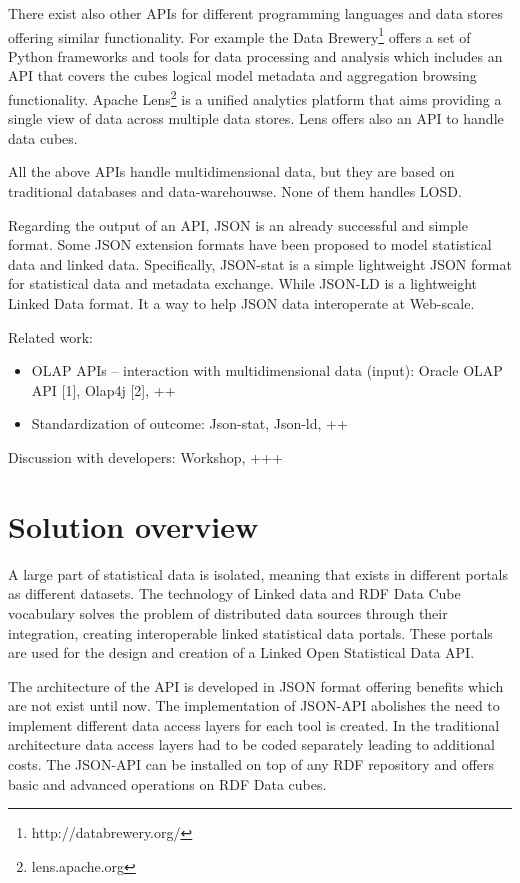 \documentclass{llncs}
\begin{document}
There exist also other APIs for different programming languages and data stores offering similar functionality. For example the Data Brewery\footnote{http://databrewery.org/} offers a set of Python frameworks and tools for data processing and analysis which includes an API that covers the cubes logical model metadata and aggregation browsing functionality. Apache Lens\footnote{lens.apache.org} is a unified analytics platform that aims providing a single view of data across multiple data stores. Lens offers also an API to handle data cubes.

All the above APIs handle multidimensional data, but they are based on traditional databases and data-warehouwse. None of them handles LOSD. 

Regarding the output of an API, JSON is an already successful and simple format. Some JSON extension formats have been proposed to model statistical data and linked data. Specifically, JSON-stat is a simple lightweight JSON  format for statistical data and metadata exchange. While 
JSON-LD is a lightweight Linked Data format. It a way to help JSON data interoperate at Web-scale. 

Related work:
\begin{itemize}
\item  OLAP APIs – interaction with multidimensional data (input): Oracle OLAP API [1], Olap4j [2], ++
\item Standardization of outcome: Json-stat, Json-ld, ++
\end{itemize}

Discussion with developers: Workshop, +++

\section{Solution overview}\label{sec:overview}

A large part of statistical data is isolated, meaning that exists in different portals as different datasets. The technology of Linked data and RDF Data Cube vocabulary solves the problem of distributed data sources through their integration, creating interoperable linked statistical data portals. These portals are used for the design and creation of a Linked Open Statistical Data API.
 
The architecture of the API is developed in JSON format offering benefits which are not exist until now. The implementation of JSON-API abolishes the need to implement different data access layers for each tool is created. In the traditional architecture data access layers had to be coded separately leading to additional costs. The JSON-API can be installed on top of any RDF repository and offers basic and advanced operations on RDF Data cubes.
 
\end{document}
